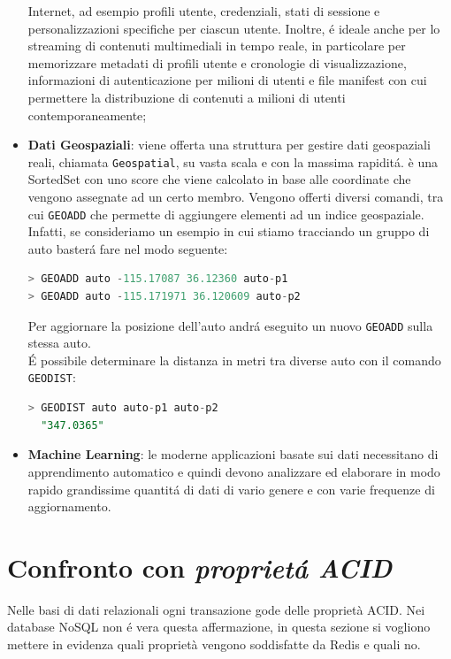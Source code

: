\begin{itemize}
    Internet, ad esempio profili utente, credenziali, stati di sessione e personalizzazioni specifiche per ciascun utente. Inoltre, é ideale anche
    per lo streaming di contenuti multimediali in tempo reale, in particolare per memorizzare metadati di profili utente e cronologie di visualizzazione,
    informazioni di autenticazione per milioni di utenti e file manifest con cui permettere la distribuzione di contenuti a milioni di utenti
    contemporaneamente;
    \item \textbf{Dati Geospaziali}: viene offerta una struttura per gestire dati geospaziali reali, chiamata \texttt{Geospatial},
    su vasta scala e con la massima rapiditá. è una SortedSet con uno score che viene calcolato in base alle coordinate che vengono assegnate ad un certo membro.
    Vengono offerti diversi comandi, tra cui \texttt{GEOADD} che permette di aggiungere elementi ad un indice geospaziale.
    Infatti, se consideriamo un esempio in cui stiamo tracciando un gruppo di auto basterá fare nel modo seguente:
    \begin{lstlisting}[autogobble, style=redis-cli, language=SQL]
> GEOADD auto -115.17087 36.12360 auto-p1
> GEOADD auto -115.171971 36.120609 auto-p2\end{lstlisting}
    Per aggiornare la posizione dell'auto andrá eseguito un nuovo \texttt{GEOADD} sulla stessa auto.\\
    É possibile determinare la distanza in metri tra diverse auto con il comando \texttt{GEODIST}:
    \begin{lstlisting}[autogobble, style=redis-cli, language=SQL]
> GEODIST auto auto-p1 auto-p2
  "347.0365"\end{lstlisting}
    \item \textbf{Machine Learning}: le moderne applicazioni basate sui dati necessitano di apprendimento automatico e quindi devono analizzare
    ed elaborare in modo rapido grandissime quantitá di dati di vario genere e con varie frequenze di aggiornamento.
\end{itemize}


\section{Confronto con \emph{proprietá ACID}}
Nelle basi di dati relazionali ogni transazione gode delle proprietà ACID. Nei database NoSQL non é vera questa affermazione, in questa
sezione si vogliono mettere in evidenza quali proprietà vengono soddisfatte da Redis e quali no.

